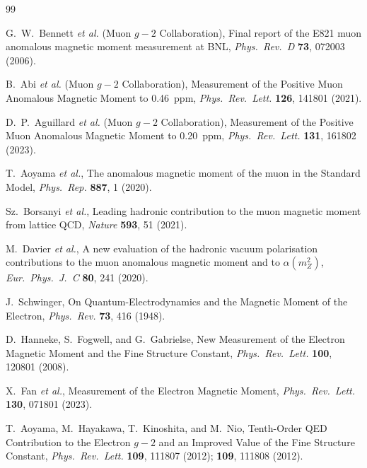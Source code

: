 \documentclass[aps,prd,reprint,nofootinbib]{revtex4-2}
\begin{document}
\begin{thebibliography}{99}

G.~W.~Bennett \textit{et al.} (Muon $g-2$ Collaboration),
\newblock Final report of the E821 muon anomalous magnetic moment measurement at BNL,
\newblock \textit{Phys.\ Rev.\ D} \textbf{73}, 072003 (2006).

B.~Abi \textit{et al.} (Muon $g-2$ Collaboration),
\newblock Measurement of the Positive Muon Anomalous Magnetic Moment to 0.46~ppm,
\newblock \textit{Phys.\ Rev.\ Lett.} \textbf{126}, 141801 (2021).

D.~P.~Aguillard \textit{et al.} (Muon $g-2$ Collaboration),
\newblock Measurement of the Positive Muon Anomalous Magnetic Moment to 0.20~ppm,
\newblock \textit{Phys.\ Rev.\ Lett.} \textbf{131}, 161802 (2023).

T.~Aoyama \textit{et al.},
\newblock The anomalous magnetic moment of the muon in the Standard Model,
\newblock \textit{Phys.\ Rep.} \textbf{887}, 1 (2020).

Sz.~Borsanyi \textit{et al.},
\newblock Leading hadronic contribution to the muon magnetic moment from lattice QCD,
\newblock \textit{Nature} \textbf{593}, 51 (2021).

M.~Davier \textit{et al.},
\newblock A new evaluation of the hadronic vacuum polarisation contributions to the muon anomalous magnetic moment and to $\alpha(m_Z^2)$,
\newblock \textit{Eur.\ Phys.\ J.\ C} \textbf{80}, 241 (2020).

J.~Schwinger,
\newblock On Quantum-Electrodynamics and the Magnetic Moment of the Electron,
\newblock \textit{Phys.\ Rev.} \textbf{73}, 416 (1948).

D.~Hanneke, S.~Fogwell, and G.~Gabrielse,
\newblock New Measurement of the Electron Magnetic Moment and the Fine Structure Constant,
\newblock \textit{Phys.\ Rev.\ Lett.} \textbf{100}, 120801 (2008).

X.~Fan \textit{et al.},
\newblock Measurement of the Electron Magnetic Moment,
\newblock \textit{Phys.\ Rev.\ Lett.} \textbf{130}, 071801 (2023).

T.~Aoyama, M.~Hayakawa, T.~Kinoshita, and M.~Nio,
\newblock Tenth-Order QED Contribution to the Electron $g-2$ and an Improved Value of the Fine Structure Constant,
\newblock \textit{Phys.\ Rev.\ Lett.} \textbf{109}, 111807 (2012); \textbf{109}, 111808 (2012).


\end{thebibliography}
\end{document}
